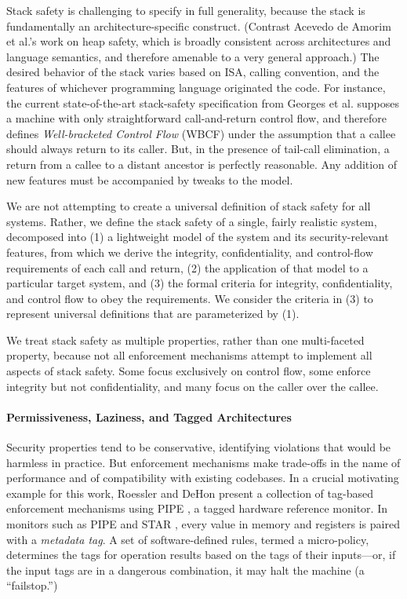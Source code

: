 Stack safety is challenging to specify in full generality, because the stack is fundamentally
an architecture-specific construct. (Contrast Acevedo de Amorim et al.'s \cite{} work on heap safety,
which is broadly consistent across architectures and language semantics, and therefore amenable
to a very general approach.)
The desired behavior of the stack varies based on ISA, calling convention,
and the features of whichever programming language originated the code.
For instance, the current state-of-the-art stack-safety specification from Georges et al.
\cite{Georges22:TempsDesCerises} supposes a machine with only straightforward call-and-return
control flow, and therefore defines {\it Well-bracketed Control Flow} (WBCF) under the assumption that
a callee should always return to its caller. But, in the presence of tail-call elimination, a
return from a callee to a distant ancestor is perfectly reasonable. Any addition of new features
must be accompanied by tweaks to the model.
%

We are not attempting to create a universal definition of stack safety for all systems.
Rather, we define the stack safety of a single, fairly realistic system, decomposed into
(1) a lightweight model of the system and its security-relevant features, from which we
derive the integrity, confidentiality, and control-flow requirements of each call and
return, (2) the application of that model to a particular target system, and (3)
the formal criteria for integrity, confidentiality, and control flow
to obey the requirements. We consider the criteria in (3) to represent universal definitions
that are parameterized by (1).
%

We treat stack safety as multiple properties, rather than one multi-faceted property, because
not all enforcement mechanisms attempt to implement all aspects of stack safety. Some focus
exclusively on control flow, some enforce integrity but not confidentiality, and many
focus on the caller over the callee.
%

\paragraph*{Permissiveness, Laziness, and Tagged Architectures}

Security properties tend to be conservative, identifying violations that would be
harmless in practice. But enforcement mechanisms make trade-offs in the name of performance
and of compatibility with existing codebases. In a crucial motivating example for this work,
Roessler and DeHon \cite{} present a collection of tag-based enforcement mechanisms
using PIPE \cite{???}, a tagged hardware reference monitor. In monitors such as PIPE and
STAR \cite{???}, every value in memory and registers is paired with a {\em metadata tag}.
A set of software-defined rules, termed a micro-policy, determines the tags for operation
results based on the tags of their inputs---or, if the input tags are in a dangerous
combination, it may halt the machine (a ``failstop.'')

